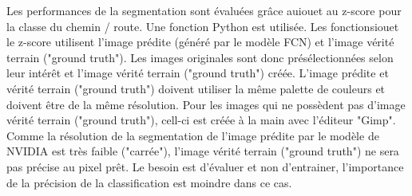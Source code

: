 \par Les performances de la segmentation sont évaluées grâce au\acrshort{iou}et au z-score pour la classe du chemin / route. Une fonction Python est utilisée. Les fonctions\acrshort{iou}et le z-score utilisent l'image prédite (généré par le modèle FCN) et l'image vérité terrain ("ground truth"). Les images originales sont donc présélectionnées selon leur intérêt et l'image vérité terrain ("ground truth") créée. L'image prédite et vérité terrain ("ground truth") doivent utiliser la même palette de couleurs et doivent être de la même résolution. Pour les images qui ne possèdent pas d'image vérité terrain ("ground truth"), cell-ci est créée à la main avec l'éditeur "Gimp". Comme la résolution de la segmentation de l'image prédite par le modèle de NVIDIA est très faible ("carrée"), l'image vérité terrain ("ground truth") ne sera pas précise au pixel prêt. Le besoin est d'évaluer et non d'entrainer, l'importance de la précision de la classification est moindre dans ce cas. 